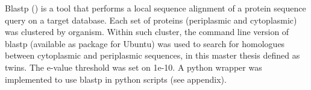 Blastp  (\cite{korf2003}) is a tool that performs a local sequence alignment of a protein sequence query on a target database.
Each set of proteins (periplasmic and cytoplasmic) was clustered by organism.
Within such cluster,
the command line version of blastp (available as package for Ubuntu) was used to search for homologues between cytoplasmic and periplasmic sequences, 
in this master thesis defined as twins.
The e-value threshold was set on 1e-10.
A python wrapper was implemented to use blastp in python scripts (see appendix).
